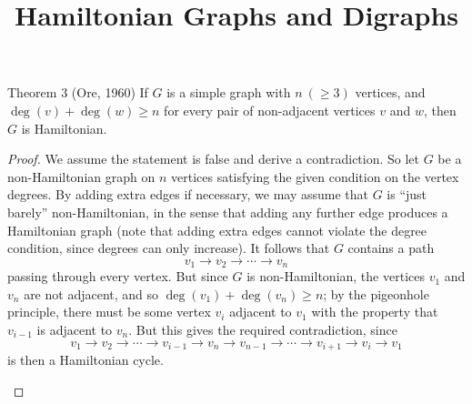\documentclass[11pt]{scrartcl}
\title{\color{accentblue}Hamiltonian Graphs and Digraphs}
\author{}
\date{}
\theoremstyle{plain}
\theoremstyle{remark}
\begin{document}
\maketitle

\begin{thmbox}{{Theorem 3 (Ore, 1960)}}
If $G$ is a simple graph with $n\ (\geq 3)$ vertices, and $\deg(v) + \deg(w) \geq n$ for every pair of non-adjacent vertices $v$ and $w$, then $G$ is Hamiltonian.
\end{thmbox}

\begin{proof}
We assume the statement is false and derive a contradiction. So let $G$ be a non-Hamiltonian graph on $n$ vertices satisfying the given condition on the vertex degrees. By adding extra edges if necessary, we may assume that $G$ is ``just barely'' non-Hamiltonian, in the sense that adding any further edge produces a Hamiltonian graph (note that adding extra edges cannot violate the degree condition, since degrees can only increase). It follows that $G$ contains a path
$$v_1 \to v_2 \to \cdots \to v_n$$
passing through every vertex. But since $G$ is non-Hamiltonian, the vertices $v_1$ and $v_n$ are not adjacent, and so $\deg(v_1) + \deg(v_n) \geq n$; by the pigeonhole principle, there must be some vertex $v_i$ adjacent to $v_1$ with the property that $v_{i-1}$ is adjacent to $v_n$. But this gives the required contradiction, since
$$v_1 \to v_2 \to \cdots \to v_{i-1} \to v_n \to v_{n-1} \to \cdots \to v_{i+1} \to v_i \to v_1$$
is then a Hamiltonian cycle.

\begin{center}
\end{center}
\end{proof}
\end{document}

